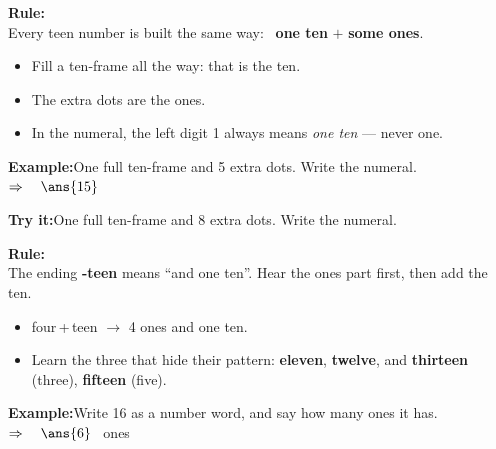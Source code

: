 \documentclass[12pt]{article}
\begin{document}


\begin{formulabox}
\textbf{Rule:}\\[4pt]
Every teen number is built the same way: \ \textbf{one ten} $+$ \textbf{some ones}.
\begin{itemize}[leftmargin=0.8cm, itemsep=1pt, topsep=2pt]
  \item Fill a ten-frame all the way: that is the ten.
  \item The extra dots are the ones.
  \item In the numeral, the left digit 1 always means \emph{one ten} --- never one.
\end{itemize}
\end{formulabox}

\begin{examplebox}
\textbf{Example:}\quad One full ten-frame and 5 extra dots. Write the numeral.
$\Rightarrow\quad \ans{15}$
\end{examplebox}

\begin{tryitbox}
\textbf{Try it:}\quad One full ten-frame and 8 extra dots. Write the numeral.\\[2pt]
\end{tryitbox}


\begin{formulabox}
\textbf{Rule:}\\[4pt]
The ending \textbf{-teen} means ``and one ten''. Hear the ones part first, then
add the ten.
\begin{itemize}[leftmargin=0.8cm, itemsep=1pt, topsep=2pt]
  \item four\,+\,teen $\rightarrow$ 4 ones and one ten.
  \item Learn the three that hide their pattern: \textbf{eleven}, \textbf{twelve},
        and \textbf{thirteen} (three), \textbf{fifteen} (five).
\end{itemize}
\end{formulabox}

\begin{examplebox}
\textbf{Example:}\quad Write 16 as a number word, and say how many ones it has.
$\Rightarrow\quad \ans{6}$ \ ones
\end{examplebox}
\end{document}
